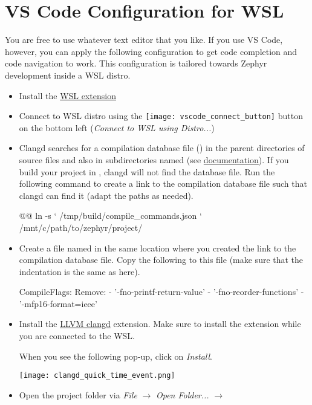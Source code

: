 \section{VS Code Configuration for WSL}

You are free to use whatever text editor that you like.
If you use VS Code, however, you can apply the following configuration to get code completion and code navigation to work.
This configuration is tailored towards Zephyr development inside a WSL distro.

\begin{itemize}
  \item Install the \href{https://marketplace.visualstudio.com/items?itemName=ms-vscode-remote.remote-wsl}{WSL extension}
  \item Connect to WSL distro using the \texttt{[image: vscode\_connect\_button]} button on the bottom left (\emph{Connect to WSL using Distro...})
  \item Clangd searches for a compilation database file () in the parent directories of source files and also in subdirectories named  (see \href{https://clangd.llvm.org/installation#project-setup}{documentation}).
    If you build your project in , clangd will not find the database file.
    Run the following command to create a link to the compilation database file such that clangd can find it (adapt the paths as needed).

\begin{monobox}
@\cmdinwsl{}@ ln -s `
  /tmp/build/compile_commands.json `
  /mnt/c/path/to/zephyr/project/
\end{monobox}
  \item Create a file named  in the same location where you created the link to the compilation database file.
    Copy the following to this file (make sure that the indentation is the same as here).

\begin{monobox}
CompileFlags:
  Remove:
    - '-fno-printf-return-value'
    - '-fno-reorder-functions'
    - '-mfp16-format=ieee'
\end{monobox}
  \item Install the \href{https://marketplace.visualstudio.com/items?itemName=llvm-vs-code-extensions.vscode-clangd}{LLVM clangd} extension.
    Make sure to install the extension while you are connected to the WSL.

    When you see the following pop-up, click on \emph{Install}.
    \begin{center}
      \texttt{[image: clangd\_quick\_time\_event.png]}
    \end{center}
  \item Open the project folder via \emph{File} $\rightarrow$ \emph{Open Folder...} $\rightarrow$ 
\end{itemize}
